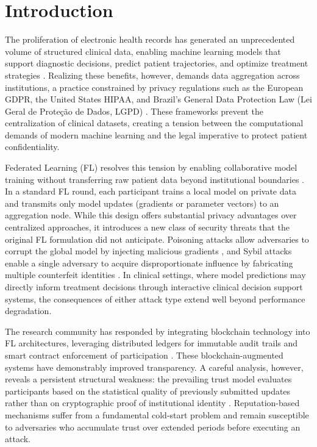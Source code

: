 \documentclass[english]{sbc2025}
\begin{document}
\section{Introduction}
\label{sec:intro}

The proliferation of electronic health records has generated an unprecedented volume of structured clinical data, enabling machine learning models that support diagnostic decisions, predict patient trajectories, and optimize treatment strategies \citep{mcmahan2017communication}. Realizing these benefits, however, demands data aggregation across institutions, a practice constrained by privacy regulations such as the European GDPR, the United States HIPAA, and Brazil's General Data Protection Law (Lei Geral de Prote\c{c}\~{a}o de Dados, LGPD) \citep{SAKAMOTO20213049}. These frameworks prevent the centralization of clinical datasets, creating a tension between the computational demands of modern machine learning and the legal imperative to protect patient confidentiality.

Federated Learning (FL) resolves this tension by enabling collaborative model training without transferring raw patient data beyond institutional boundaries \citep{10.1145/3735125}. In a standard FL round, each participant trains a local model on private data and transmits only model updates (gradients or parameter vectors) to an aggregation node. While this design offers substantial privacy advantages over centralized approaches, it introduces a new class of security threats that the original FL formulation did not anticipate. Poisoning attacks allow adversaries to corrupt the global model by injecting malicious gradients \citep{campos2025flaegis}, and Sybil attacks enable a single adversary to acquire disproportionate influence by fabricating multiple counterfeit identities \citep{srivastava2024federated}. In clinical settings, where model predictions may directly inform treatment decisions through interactive clinical decision support systems, the consequences of either attack type extend well beyond performance degradation.

The research community has responded by integrating blockchain technology into FL architectures, leveraging distributed ledgers for immutable audit trails and smart contract enforcement of participation \citep{ning2024blockchain}. These blockchain-augmented systems have demonstrably improved transparency. A careful analysis, however, reveals a persistent structural weakness: the prevailing trust model evaluates participants based on the statistical quality of previously submitted updates rather than on cryptographic proof of institutional identity \citep{nguyen2022latency}. Reputation-based mechanisms suffer from a fundamental cold-start problem and remain susceptible to adversaries who accumulate trust over extended periods before executing an attack.
\end{document}
